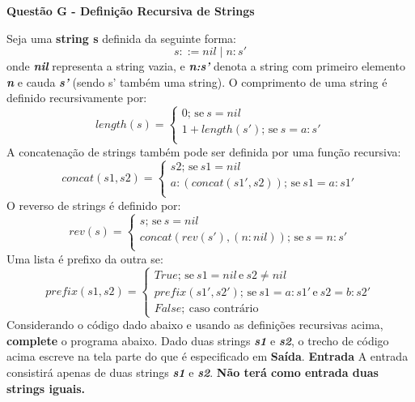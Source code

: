 \documentclass[a4paper, 12pt]{article}
\begin{document}
\newpage %
\begin{center}
\textbf{{\Large Questão G - Definição Recursiva de Strings}}
\end{center}
\vspace{5pt}
Seja uma \textbf{string s} definida da seguinte forma: $$s::= nil \mid n:s' $$onde \textbf{\textit{nil}} representa a string vazia, e \textbf{\textit{n:s'}} denota a string com primeiro elemento \textbf{\textit{n}} e cauda \textbf{\textit{s'}} (sendo s' também uma string). \newline 
O comprimento de uma string é definido recursivamente por:
$$length(s) =
		\begin{cases}
			0;\, \textrm{se}\ s = nil \\
			1 + length(s');\, \textrm{se}\ s = a:s' \\
		\end{cases}
$$
A concatenação de strings também pode ser definida por uma função recursiva:
$$concat(s1,s2) =
		\begin{cases}
			s2;\, \textrm{se}\ s1 = nil \\
			a:(concat(s1',s2));\, \textrm{se}\ s1 = a:s1' \\
		\end{cases}
$$
O reverso de strings é definido por:
$$rev(s) =
		\begin{cases}
			s;\, \textrm{se}\ s = nil \\
			concat(rev(s'), (n:nil));\, \textrm{se}\ s = n:s' \\
		\end{cases}
$$
Uma lista é prefixo da outra se:
$$prefix(s1,s2) =
		\begin{cases}
			True;\, \textrm{se}\ s1 = nil\, \textrm{e}\  s2 \neq nil\\
			prefix(s1', s2');\, \textrm{se}\ s1 = a:s1'\, \textrm{e}\ s2 = b:s2' \\
			False;\ \textrm{caso contrário}
		\end{cases}
$$
Considerando o código dado abaixo e usando as definições recursivas acima, \textbf{complete} o programa abaixo.
Dado duas strings \textbf{\textit{s1}} e \textbf{\textit{s2}}, o trecho de código acima escreve na tela parte do que é especificado em \textbf{Saída}. \newline \newline
\textbf{{\large Entrada}} \newline
A entrada consistirá apenas de duas strings \textbf{\textit{s1}} e \textbf{\textit{s2}}. \textbf{Não terá como entrada duas strings iguais.}
\end{document}
